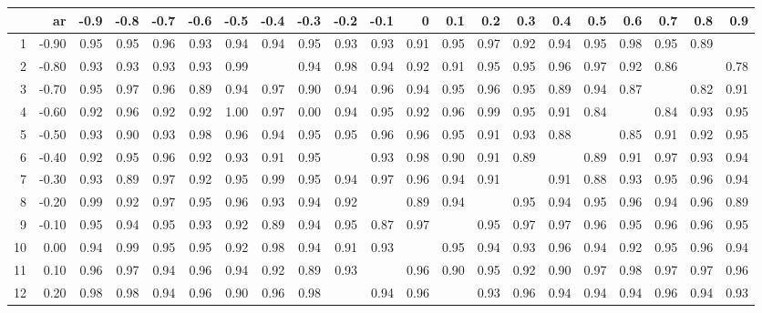 \begin{table}[ht]
\centering
\begin{tabular}{rrrrrrrrrrrrrrrrrrrrr}
  \hline
 & ar & -0.9 & -0.8 & -0.7 & -0.6 & -0.5 & -0.4 & -0.3 & -0.2 & -0.1 & 0 & 0.1 & 0.2 & 0.3 & 0.4 & 0.5 & 0.6 & 0.7 & 0.8 & 0.9 \\ 
  \hline
1 & -0.90 & 0.95 & 0.95 & 0.96 & 0.93 & 0.94 & 0.94 & 0.95 & 0.93 & 0.93 & 0.91 & 0.95 & 0.97 & 0.92 & 0.94 & 0.95 & 0.98 & 0.95 & 0.89 &  \\ 
  2 & -0.80 & 0.93 & 0.93 & 0.93 & 0.93 & 0.99 &  & 0.94 & 0.98 & 0.94 & 0.92 & 0.91 & 0.95 & 0.95 & 0.96 & 0.97 & 0.92 & 0.86 &  & 0.78 \\ 
  3 & -0.70 & 0.95 & 0.97 & 0.96 & 0.89 & 0.94 & 0.97 & 0.90 & 0.94 & 0.96 & 0.94 & 0.95 & 0.96 & 0.95 & 0.89 & 0.94 & 0.87 &  & 0.82 & 0.91 \\ 
  4 & -0.60 & 0.92 & 0.96 & 0.92 & 0.92 & 1.00 & 0.97 & 0.00 & 0.94 & 0.95 & 0.92 & 0.96 & 0.99 & 0.95 & 0.91 & 0.84 &  & 0.84 & 0.93 & 0.95 \\ 
  5 & -0.50 & 0.93 & 0.90 & 0.93 & 0.98 & 0.96 & 0.94 & 0.95 & 0.95 & 0.96 & 0.96 & 0.95 & 0.91 & 0.93 & 0.88 &  & 0.85 & 0.91 & 0.92 & 0.95 \\ 
  6 & -0.40 & 0.92 & 0.95 & 0.96 & 0.92 & 0.93 & 0.91 & 0.95 &  & 0.93 & 0.98 & 0.90 & 0.91 & 0.89 &  & 0.89 & 0.91 & 0.97 & 0.93 & 0.94 \\ 
  7 & -0.30 & 0.93 & 0.89 & 0.97 & 0.92 & 0.95 & 0.99 & 0.95 & 0.94 & 0.97 & 0.96 & 0.94 & 0.91 &  & 0.91 & 0.88 & 0.93 & 0.95 & 0.96 & 0.94 \\ 
  8 & -0.20 & 0.99 & 0.92 & 0.97 & 0.95 & 0.96 & 0.93 & 0.94 & 0.92 &  & 0.89 & 0.94 &  & 0.95 & 0.94 & 0.95 & 0.96 & 0.94 & 0.96 & 0.89 \\ 
  9 & -0.10 & 0.95 & 0.94 & 0.95 & 0.93 & 0.92 & 0.89 & 0.94 & 0.95 & 0.87 & 0.97 &  & 0.95 & 0.97 & 0.97 & 0.96 & 0.95 & 0.96 & 0.96 & 0.95 \\ 
  10 & 0.00 & 0.94 & 0.99 & 0.95 & 0.95 & 0.92 & 0.98 & 0.94 & 0.91 & 0.93 &  & 0.95 & 0.94 & 0.93 & 0.96 & 0.94 & 0.92 & 0.95 & 0.96 & 0.94 \\ 
  11 & 0.10 & 0.96 & 0.97 & 0.94 & 0.96 & 0.94 & 0.92 & 0.89 & 0.93 &  & 0.96 & 0.90 & 0.95 & 0.92 & 0.90 & 0.97 & 0.98 & 0.97 & 0.97 & 0.96 \\ 
  12 & 0.20 & 0.98 & 0.98 & 0.94 & 0.96 & 0.90 & 0.96 & 0.98 &  & 0.94 & 0.96 &  & 0.93 & 0.96 & 0.94 & 0.94 & 0.94 & 0.96 & 0.94 & 0.93 \\ 

\end{tabular}
\end{table}
